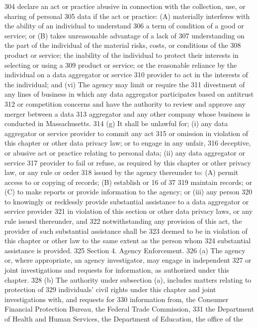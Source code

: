 304 declare an act or practice abusive in connection with the collection, use, or sharing of personal
305 data if the act or practice: (A) materially interferes with the ability of an individual to understand
306 a term of condition of a good or service; or (B) takes unreasonable advantage of a lack of
307 understanding on the part of the individual of the material risks, costs, or conditions of the
308 product or service; the inability of the individual to protect their interests in selecting or using a
309 product or service; or the reasonable reliance by the individual on a data aggregator or service
310 provider to act in the interests of the individual; and (vi) The agency may limit or require the
311 divestment of any lines of business in which any data aggregator participates based on antitrust
312 or competition concerns and have the authority to review and approve any merger between a data
313 aggregator and any other company whose business is conducted in Massachusetts.
314 (g) It shall be unlawful for; (i) any data aggregator or service provider to commit any act
315 or omission in violation of this chapter or other data privacy law; or to engage in any unfair,
316 deceptive, or abusive act or practice relating to personal data; (ii) any data aggregator or service
317 provider to fail or refuse, as required by this chapter or other privacy law, or any rule or order
318 issued by the agency thereunder to: (A) permit access to or copying of records; (B) establish or
16 of 37
319 maintain records; or (C) to make reports or provide information to the agency; or (iii) any person
320 to knowingly or recklessly provide substantial assistance to a data aggregator or service provider
321 in violation of this section or other data privacy laws, or any rule issued thereunder, and
322 notwithstanding any provision of this act, the provider of such substantial assistance shall be
323 deemed to be in violation of this chapter or other law to the same extent as the person whom
324 substantial assistance is provided.
325 Section 4. Agency Enforcement.
326 (a) The agency or, where appropriate, an agency investigator, may engage in independent
327 or joint investigations and requests for information, as authorized under this chapter.
328 (b) The authority under subsection (a), includes matters relating to protection of
329 individuals’ civil rights under this chapter and joint investigations with, and requests for
330 information from, the Consumer Financial Protection Bureau, the Federal Trade Commission,
331 the Department of Health and Human Services, the Department of Education, the office of the
